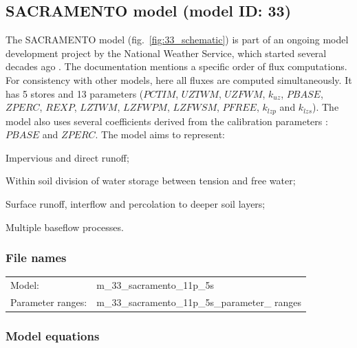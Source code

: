 \subsection{SACRAMENTO model (model ID: 33)}
The SACRAMENTO model (fig.~\ref{fig:33_schematic}) is part of an ongoing model development project by the National Weather Service, which started several decades ago \citep{Burnash1995,NationalWeatherService2005}. The documentation mentions a specific order of flux computations. For consistency with other models, here all fluxes are computed simultaneously. It has 5 stores and 13 parameters ($PCTIM$, $UZTWM$, $UZFWM$, $k_{uz}$, $PBASE$, $ZPERC$, $REXP$, $LZTWM$, $LZFWPM$, $LZFWSM$, $PFREE$, $k_{lzp}$ and $k_{lzs}$). The model also uses several coefficients derived from the calibration parameters \citep{Koren2000}: $PBASE$ and $ZPERC$. The model aims to represent:

\begin{itemizecompact}
\item Impervious and direct runoff;
\item Within soil division of water storage between tension and free water;
\item Surface runoff, interflow and percolation to deeper soil layers;
\item Multiple baseflow processes.
\end{itemizecompact}

\subsubsection{File names}
\begin{tabular}{@{}ll}
Model: &m\_33\_sacramento\_11p\_5s \\
Parameter ranges: &m\_33\_sacramento\_11p\_5s\_parameter\_ ranges \\
\end{tabular}

\subsubsection{Model equations}

